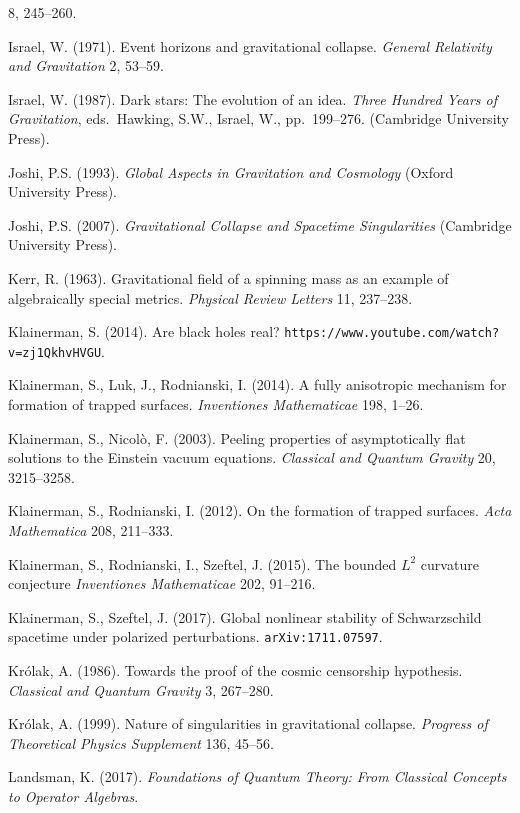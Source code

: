 \documentclass[11pt,a4paper]{article}
\begin{document}
\begin{small}
\begin{thebibliography}{99}
  8, 245--260. 
  \item[] Israel, W. (1971). Event horizons and gravitational collapse. \emph{General Relativity and Gravitation}
2, 53--59. 
 \item[] Israel, W. (1987). Dark stars: The evolution of an idea. \emph{Three Hundred Years of Gravitation}, eds.\ Hawking, S.W., Israel, W., pp.\ 199--276.
(Cambridge University Press). 
\item[] Joshi, P.S. (1993). \emph{Global Aspects in Gravitation and Cosmology} (Oxford University Press). 
\item[] Joshi, P.S. (2007). \emph{Gravitational Collapse and Spacetime Singularities}  (Cambridge University Press).
\item[] Kerr, R. (1963). Gravitational field of a spinning mass as an example of algebraically special
metrics. \emph{Physical Review Letters} 11, 237--238.
\item[]  Klainerman, S. (2014). Are black holes real? \verb#https://www.youtube.com/watch?v=zj1QkhvHVGU#.
\item[]  Klainerman, S.,  Luk, J.,  Rodnianski, I.  (2014). A fully anisotropic mechanism for formation of
trapped surfaces.  \emph{Inventiones Mathematicae} 198, 1--26. 
\item[]  Klainerman, S.,   Nicol\`{o}, F. (2003). Peeling properties of asymptotically flat solutions to the Einstein vacuum equations. \emph{Classical and Quantum Gravity} 20, 3215--3258.
\item[]  Klainerman, S.,  Rodnianski, I. (2012). On the formation of trapped surfaces. \emph{Acta Mathematica}
 208,  211--333.
\item[]  Klainerman, S.,  Rodnianski, I., Szeftel, J. (2015).
The bounded $L^2$ curvature conjecture \emph{Inventiones Mathematicae} 202, 91--216.
\item[]  Klainerman, S.,  Szeftel, J. (2017).
Global nonlinear stability of Schwarzschild spacetime under polarized perturbations.
\texttt{arXiv:1711.07597}.
\item[]  Kr\'{o}lak, A. (1986). Towards the proof of the cosmic censorship hypothesis. \emph{Classical and Quantum Gravity} 3, 267--280. 
\item[]  Kr\'{o}lak, A. (1999). Nature of singularities in gravitational collapse.
\emph{Progress of Theoretical Physics Supplement} 136, 45--56. 
\item[]   Landsman, K. (2017). \emph{Foundations of Quantum Theory: From Classical Concepts to Operator Algebras}. 

\end{thebibliography}
\end{small}
\end{document}
